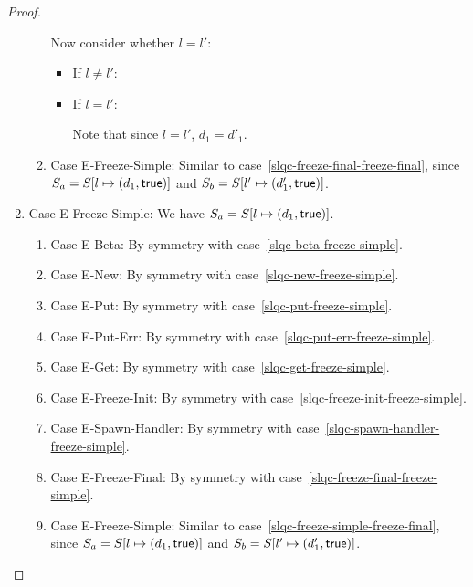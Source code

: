 \begin{proof}
\begin{enumerate}
\begin{enumerate}
      Now consider whether $l = l'$:
      \begin{itemize}
        \item If $l \neq l'$:

          \TODO{}

        \item If $l = l'$:

          Note that since $l = l'$, $d_1 = d'_1$.

          \TODO{}
      \end{itemize}


    \item \label{slqc-freeze-final-freeze-simple}Case {\sc
      E-Freeze-Simple}: Similar to
      case~\ref{slqc-freeze-final-freeze-final}, since $S_a =
      S[l \mapsto (d_1, \textsf{true})]$ and $S_b =
      S[l' \mapsto (d'_1, \textsf{true})]$.
    \end{enumerate}

  \item Case {\sc E-Freeze-Simple}: We have $S_a =
    S[l \mapsto (d_1, \textsf{true})]$.

    \begin{enumerate}
    \item \label{slqc-freeze-simple-beta}Case {\sc E-Beta}: By symmetry with case~\ref{slqc-beta-freeze-simple}.
    \item \label{slqc-freeze-simple-new}Case {\sc E-New}: By symmetry with case~\ref{slqc-new-freeze-simple}.
    \item \label{slqc-freeze-simple-put}Case {\sc E-Put}: By symmetry with case~\ref{slqc-put-freeze-simple}.
    \item \label{slqc-freeze-simple-put-err}Case {\sc E-Put-Err}: By symmetry with case~\ref{slqc-put-err-freeze-simple}.
    \item \label{slqc-freeze-simple-get}Case {\sc E-Get}: By symmetry with case~\ref{slqc-get-freeze-simple}.
    \item \label{slqc-freeze-simple-freeze-init}Case {\sc E-Freeze-Init}: By symmetry with case~\ref{slqc-freeze-init-freeze-simple}.
    \item \label{slqc-freeze-simple-spawn-handler}Case {\sc E-Spawn-Handler}: By symmetry with case~\ref{slqc-spawn-handler-freeze-simple}.
    \item \label{slqc-freeze-simple-freeze-final}Case {\sc E-Freeze-Final}: By symmetry with case~\ref{slqc-freeze-final-freeze-simple}.
    \item \label{slqc-freeze-simple-freeze-simple}Case {\sc
      E-Freeze-Simple}: Similar to
      case~\ref{slqc-freeze-simple-freeze-final}, since $S_a =
      S[l \mapsto (d_1, \textsf{true})]$ and $S_b =
      S[l' \mapsto (d'_1, \textsf{true})]$.
    \end{enumerate}

  \end{enumerate}
\end{proof}

